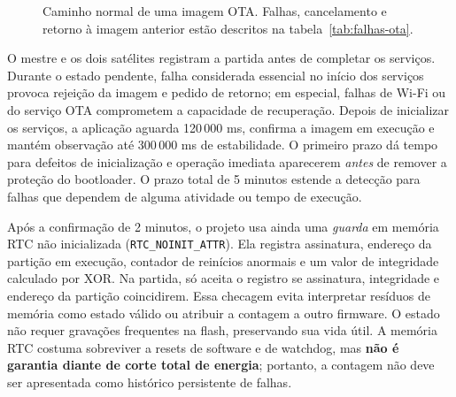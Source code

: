 \begin{figure}[htbp]\centering
{}
\caption{Caminho normal de uma imagem OTA. Falhas, cancelamento e retorno à imagem anterior estão descritos na tabela~\ref{tab:falhas-ota}.}\label{fig:estados-ota}
\end{figure}

O mestre e os dois satélites registram a partida antes de completar os serviços. Durante o estado pendente, falha considerada essencial no início dos serviços provoca rejeição da imagem e pedido de retorno; em especial, falhas de Wi-Fi ou do serviço OTA comprometem a capacidade de recuperação. Depois de inicializar os serviços, a aplicação aguarda 120\,000 ms, confirma a imagem em execução e mantém observação até 300\,000 ms de estabilidade. O primeiro prazo dá tempo para defeitos de inicialização e operação imediata aparecerem \emph{antes} de remover a proteção do bootloader. O prazo total de 5 minutos estende a detecção para falhas que dependem de alguma atividade ou tempo de execução.

Após a confirmação de 2 minutos, o projeto usa ainda uma \emph{guarda} em memória RTC não inicializada (\texttt{RTC\_NOINIT\_ATTR}). Ela registra assinatura, endereço da partição em execução, contador de reinícios anormais e um valor de integridade calculado por XOR. Na partida, só aceita o registro se assinatura, integridade e endereço da partição coincidirem. Essa checagem evita interpretar resíduos de memória como estado válido ou atribuir a contagem a outro firmware. O estado não requer gravações frequentes na flash, preservando sua vida útil. A memória RTC costuma sobreviver a resets de software e de watchdog, mas \textbf{não é garantia diante de corte total de energia}; portanto, a contagem não deve ser apresentada como histórico persistente de falhas.

